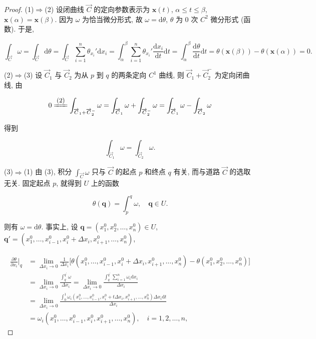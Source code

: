 \begin{proof}

(1)$\Rightarrow$(2) 设闭曲线 $\overrightarrow{C}$ 的定向参数表示为 $\boldsymbol{x}(t)$, $\alpha\leqslant t\leqslant\beta$, $\boldsymbol{x}(\alpha)=\boldsymbol{x}(\beta)$. 因为 $\omega$ 为恰当微分形式, 故 $\omega=\mathrm{d}\theta$, $\theta$ 为 $0$ 次 $C^{2}$ 微分形式 (函数). 于是,

\[
\int_{\overrightarrow{C}}\omega=\int_{\overrightarrow{C}}\mathrm{d}\theta
=\int_{\overrightarrow{C}}\sum_{i=1}^{n}\theta_{x_{i}}'\mathrm{d}x_{i}
=\int_{\alpha}^{\beta}\sum_{i=1}^{n}\theta_{x_{i}}'\frac{\mathrm{d}x_{i}}{\mathrm{d}t}\mathrm{d}t
=\int_{\alpha}^{\beta}\frac{\mathrm{d}\theta}{\mathrm{d}t}\mathrm{d}t
=\theta(\boldsymbol{x}(\beta))-\theta(\boldsymbol{x}(\alpha))=0.
\]

(2)$\Rightarrow$(3) 设 $\overrightarrow{C}_{1}$ 与 $\overrightarrow{C}_{2}$ 为从 $p$ 到 $q$ 的两条定向 $C^{1}$ 曲线, 则 $\overrightarrow{C}_{1}+\overrightarrow{C}_{2}^{-}$ 为定向闭曲线, 由

\[
0\reason{$(2)$}\int_{\overrightarrow{C}_{1}+\overrightarrow{C}_{2}^{-}}\omega
=\int_{\overrightarrow{C}_{1}}\omega+\int_{\overrightarrow{C}_{2}^{-}}\omega
=\int_{\overrightarrow{C}_{1}}\omega-\int_{\overrightarrow{C}_{2}}\omega
\]

得到

\[
\int_{\overrightarrow{C}_{1}}\omega=\int_{\overrightarrow{C}_{2}}\omega.
\]

(3)$\Rightarrow$(1) 由 (3), 积分 $\int_{\overrightarrow{C}}\omega$ 只与 $\overrightarrow{C}$ 的起点 $p$ 和终点 $q$ 有关, 而与道路 $\overrightarrow{C}$ 的选取无关. 固定起点 $p$, 就得到 $U$ 上的函数

\[
\theta(\boldsymbol{q})=\int_{p}^{q}\omega,\quad\boldsymbol{q}\in U.
\]

则有 $\omega=\mathrm{d}\theta$. 事实上, 设 $\boldsymbol{q}=(x_{1}^{0},x_{2}^{0},\dots,x_{n}^{0})\in U$, $\boldsymbol{q}'=(x_{1}^{0},\dots,x_{i-1}^{0},x_{i}^{0}+\Delta x_{i},x_{i+1}^{0},\dots,x_{n}^{0})$,

\begin{align*}
\frac{\partial\theta}{\partial x_{i}}\bigg|_{q}
&=\lim_{\Delta x_{i}\to0}\frac{1}{\Delta x_{i}}\bigl[\theta(x_{1}^{0},\dots,x_{i-1}^{0},x_{i}^{0}+\Delta x_{i},x_{i+1}^{0},\dots,x_{n}^{0})-\theta(x_{1}^{0},x_{2}^{0},\dots,x_{n}^{0})\bigr]\\
&=\lim_{\Delta x_{i}\to0}\frac{\int_{q}^{q^{\prime}}\omega}{\Delta x_{i}}
 =\lim_{\Delta x_{i}\to0}\frac{\int_{q}^{q^{\prime}}\sum_{i=1}^{n}\omega_{i}\mathrm{d}x_{i}}{\Delta x_{i}}\\
&=\lim_{\Delta x_{i}\to0}\frac{\int_{0}^{1}\omega_{i}(x_{1}^{0},\dots,x_{i-1}^{0},x_{i}^{0}+t\Delta x_{i},x_{i+1}^{0},\dots,x_{n}^{0})\Delta x_{i}\mathrm{d}t}{\Delta x_{i}}\\
&=\omega_{i}(x_{1}^{0},\dots,x_{i-1}^{0},x_{i}^{0},x_{i+1}^{0},\dots,x_{n}^{0}),\quad i=1,2,\dots,n,
\end{align*}


\end{proof}
